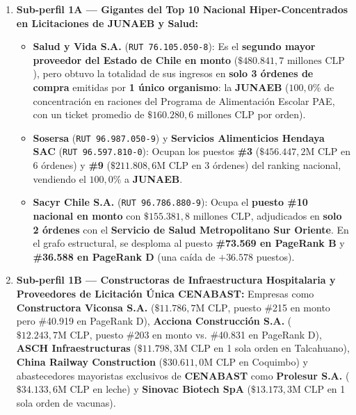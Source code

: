\documentclass[11pt,a4paper]{article}
\begin{document}
\begin{enumerate}
    \item \textbf{Sub-perfil 1A --- Gigantes del Top 10 Nacional Hiper-Concentrados en Licitaciones de JUNAEB y Salud:}
    \begin{itemize}
        \item \textbf{Salud y Vida S.A.} (\texttt{RUT 76.105.050-8}): Es el \textbf{segundo mayor proveedor del Estado de Chile en monto} (\textbf{$\$480.841,7\text{ millones CLP}$}), pero obtuvo la totalidad de sus ingresos en \textbf{solo 3 órdenes de compra} emitidas por \textbf{1 único organismo}: la \textbf{JUNAEB} ($100,0\%$ de concentración en raciones del Programa de Alimentación Escolar PAE, con un ticket promedio de $\$160.280,6\text{ millones CLP}$ por orden).
        \item \textbf{Sosersa} (\texttt{RUT 96.987.050-9}) y \textbf{Servicios Alimenticios Hendaya SAC} (\texttt{RUT 96.597.810-0}): Ocupan los puestos \textbf{\#3} ($\$456.447,2\text{M CLP}$ en 6 órdenes) y \textbf{\#9} ($\$211.808,6\text{M CLP}$ en 3 órdenes) del ranking nacional, vendiendo el $100,0\%$ a \textbf{JUNAEB}.
        \item \textbf{Sacyr Chile S.A.} (\texttt{RUT 96.786.880-9}): Ocupa el \textbf{puesto \#10 nacional en monto} con \textbf{$\$155.381,8\text{ millones CLP}$}, adjudicados en \textbf{solo 2 órdenes} con el \textbf{Servicio de Salud Metropolitano Sur Oriente}. En el grafo estructural, se desploma al puesto \textbf{\#73.569 en PageRank B} y \textbf{\#36.588 en PageRank D} (una caída de $+36.578$ puestos).
    \end{itemize}
    \item \textbf{Sub-perfil 1B --- Constructoras de Infraestructura Hospitalaria y Proveedores de Licitación Única CENABAST:} Empresas como \textbf{Constructora Viconsa S.A.} ($\$11.786,7\text{M CLP}$, puesto \#215 en monto pero \#40.919 en PageRank D), \textbf{Acciona Construcción S.A.} ($\$12.243,7\text{M CLP}$, puesto \#203 en monto vs. \#40.831 en PageRank D), \textbf{ASCH Infraestructuras} ($\$11.798,3\text{M CLP}$ en 1 sola orden en Talcahuano), \textbf{China Railway Construction} ($\$30.611,0\text{M CLP}$ en Coquimbo) y abastecedores mayoristas exclusivos de \textbf{CENABAST} como \textbf{Prolesur S.A.} ($\$34.133,6\text{M CLP}$ en leche) y \textbf{Sinovac Biotech SpA} ($\$13.173,3\text{M CLP}$ en 1 sola orden de vacunas).
\end{enumerate}
\end{document}
